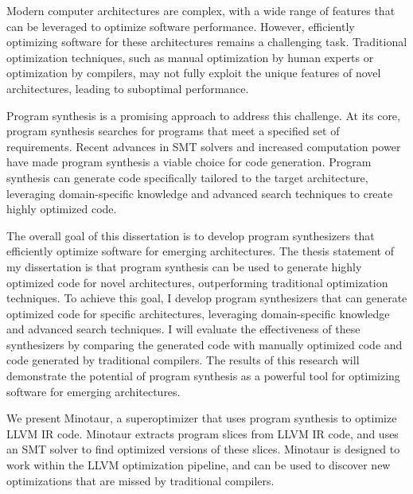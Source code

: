 

Modern computer architectures are complex, with a wide range of
features that can be leveraged to optimize software performance.
However, efficiently optimizing software for these architectures
remains a challenging task. Traditional optimization techniques,
such as manual optimization by human experts or optimization by
compilers, may not fully exploit the unique features of novel
architectures, leading to suboptimal performance.

Program synthesis is a promising approach to address this challenge.
At its core, program synthesis searches for programs that meet a
specified set of requirements. Recent advances in SMT solvers and
increased computation power have made program synthesis a viable
choice for code generation. Program synthesis can generate code
specifically tailored to the target architecture, leveraging
domain-specific knowledge and advanced search techniques to create
highly optimized code.

The overall goal of this dissertation is to develop program
synthesizers that efficiently optimize software for emerging
architectures. The thesis statement of my dissertation is that program
synthesis can be used to generate highly optimized code for novel
architectures, outperforming traditional optimization techniques. To
achieve this goal, I develop program synthesizers that can
generate optimized code for specific architectures, leveraging
domain-specific knowledge and advanced search techniques. I will
evaluate the effectiveness of these synthesizers by comparing the
generated code with manually optimized code and code generated by
traditional compilers. The results of this research will demonstrate
the potential of program synthesis as a powerful tool for optimizing
software for emerging architectures.

We present Minotaur, a superoptimizer that uses program synthesis to
optimize LLVM IR code. Minotaur extracts program slices from LLVM IR
code, and uses an SMT solver to find optimized versions of these
slices. Minotaur is designed to work within the LLVM optimization
pipeline, and can be used to discover new optimizations that are
missed by traditional compilers.

